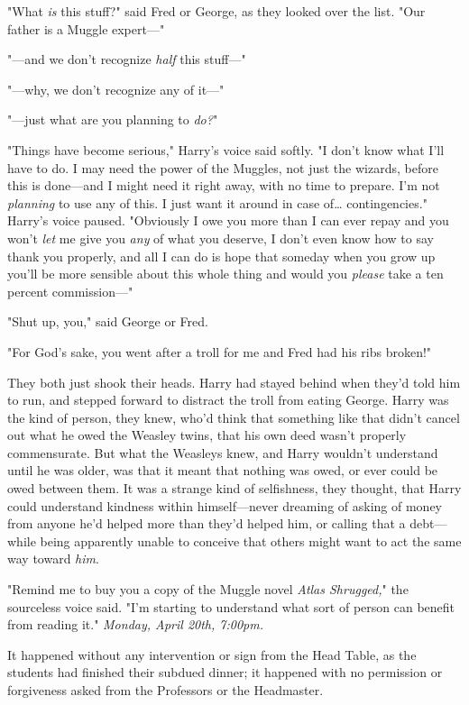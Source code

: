 "What \emph{is} this stuff?" said Fred or George, as they looked over the list. "Our father is a Muggle expert---"

"---and we don't recognize \emph{half} this stuff---"

"---why, we don't recognize any of it---"

"---just what are you planning to \emph{do?}"

"Things have become serious," Harry's voice said softly. "I don't know what I'll have to do. I may need the power of the Muggles, not just the wizards, before this is done---and I might need it right away, with no time to prepare. I'm not \emph{planning} to use any of this. I just want it around in case of{\ldots} contingencies." Harry's voice paused. "Obviously I owe you more than I can ever repay and you won't \emph{let} me give you \emph{any} of what you deserve, I don't even know how to say thank you properly, and all I can do is hope that someday when you grow up you'll be more sensible about this whole thing and would you \emph{please} take a ten percent commission---"

"Shut up, you," said George or Fred.

"For God's sake, you went after a troll for me and Fred had his ribs broken!"

They both just shook their heads. Harry had stayed behind when they'd told him to run, and stepped forward to distract the troll from eating George. Harry was the kind of person, they knew, who'd think that something like that didn't cancel out what he owed the Weasley twins, that his own deed wasn't properly commensurate. But what the Weasleys knew, and Harry wouldn't understand until he was older, was that it meant that nothing was owed, or ever could be owed between them. It was a strange kind of selfishness, they thought, that Harry could understand kindness within himself---never dreaming of asking of money from anyone he'd helped more than they'd helped him, or calling that a debt---while being apparently unable to conceive that others might want to act the same way toward \emph{him}.

"Remind me to buy you a copy of the Muggle novel \emph{Atlas Shrugged,}" the sourceless voice said. "I'm starting to understand what sort of person can benefit from reading it."
\sbreak
\emph{Monday, April 20th, 7:00pm.}

It happened without any intervention or sign from the Head Table, as the students had finished their subdued dinner; it happened with no permission or forgiveness asked from the Professors or the Headmaster.

